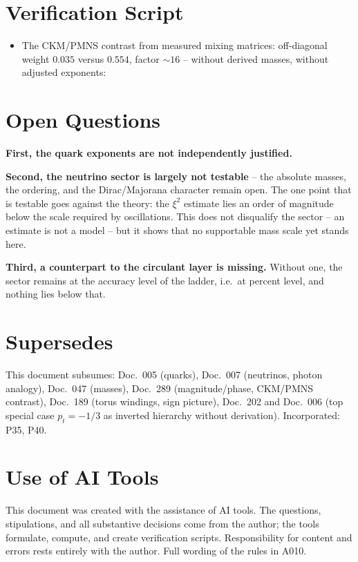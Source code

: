 \section{Verification Script}

\begin{itemize}
  \item The CKM/PMNS contrast from measured mixing matrices: off-diagonal weight
    $0{.}035$ versus $0{.}554$, factor $\sim16$ -- without derived masses, without
    adjusted exponents:
\end{itemize}

\section{Open Questions}

\textbf{First, the quark exponents are not independently justified.}

\textbf{Second, the neutrino sector is largely not testable} -- the absolute
masses, the ordering, and the Dirac/Majorana character remain open. The one point
that is testable goes against the theory: the $\xi^2$ estimate lies an order of
magnitude below the scale required by oscillations. This does not disqualify the
sector -- an estimate is not a model -- but it shows that no supportable mass scale
yet stands here.

\textbf{Third, a counterpart to the circulant layer is missing.} Without one, the
sector remains at the accuracy level of the ladder, i.e.\ at percent level, and
nothing lies below that.

\section{Supersedes}

This document subsumes: Doc.~005 (quarks), Doc.~007 (neutrinos, photon analogy),
Doc.~047 (masses), Doc.~289 (magnitude/phase, CKM/PMNS contrast), Doc.~189 (torus
windings, sign picture), Doc.~202 and Doc.~006 (top special case $p_t=-1/3$ as
inverted hierarchy without derivation). Incorporated: P35, P40.

\section{Use of AI Tools}

This document was created with the assistance of AI tools. The questions,
stipulations, and all substantive decisions come from the author; the tools
formulate, compute, and create verification scripts.
Responsibility for content and errors rests entirely with the author.
Full wording of the rules in A010.
